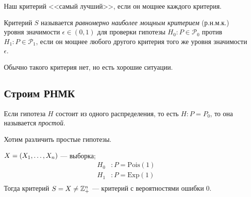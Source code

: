 Наш критерий <<самый лучший>>, если он мощнее каждого критерия.
\begin{definition}
    Критерий \(S\) называется \textit{равномерно наиболее мощным критерием} (р.н.м.к.) уровня значимости \(\epsilon \in (0, 1)\) для проверки гипотезы \(H_0: P \in \mathcal{P}_0\) против \(H_1: P \in \mathcal{P}_1\), если он мощнее любого другого критерия того же уровня значимости \(\epsilon\).
\end{definition}
\begin{remark}
    Обычно такого критерия нет, но есть хорошие ситуации.
\end{remark}

\subsection{Строим РНМК}
\begin{definition}
    Если гипотеза \(H\) состоит из одного распределения, то есть \(H: P = P_0\), то она называется \textit{простой}.
\end{definition}

Хотим различить простые гипотезы.

\begin{example}
    \(X = \left(X_1, \ldots, X_n\right)\) --- выборка;
    \begin{align*}
        H_0 &: P = \mathrm{Pois}(1) \\
        H_1 &: P = \mathrm{Exp}(1) \\
    \end{align*}
    Тогда критерий \(S = X \neq \mathbb{Z}_+^n\) --- критерий с вероятностями ошибки 0.
\end{example}

